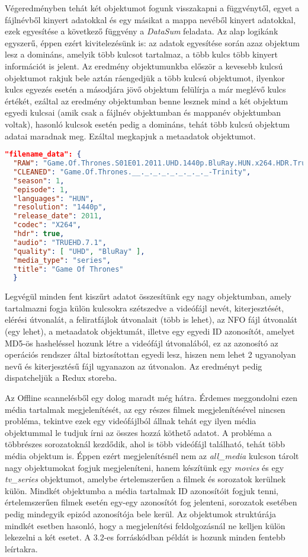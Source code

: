 Végeredményben tehát két objektumot fogunk visszakapni a függvénytől, egyet a fájlnévből kinyert adatokkal és egy másikat a mappa nevéből kinyert adatokkal, ezek egyesítése a következő függvény a {\it DataSum} feladata. Az alap logikánk egyszerű, éppen ezért kivitelezésünk is: az adatok egyesítése során azaz objektum lesz a domináns, amelyik több kulcsot tartalmaz, a több kulcs több kinyert információt is jelent. Az eredmény objektumunkba először a kevesebb kulcsú objektumot rakjuk bele aztán ráengedjük a több kulcsú objektumot, ilyenkor kulcs egyezés esetén a másodjára jövő objektum felülírja a már meglévő kulcs értékét, ezáltal az eredmény objektumban benne lesznek mind a két objektum egyedi kulcsai (amik csak a fájlnév objektumban és mappanév objektumban voltak), hasonló kulcsok esetén pedig a domináns, tehát több kulcsú objektum adatai maradnak meg. Ezáltal megkapjuk a metaadatok objektumot.

\begin{lstlisting}[language={json}]
"filename_data": {
  "RAW": "Game.Of.Thrones.S01E01.2011.UHD.1440p.BluRay.HUN.x264.HDR.TrueHD.7.1-Trinity",
  "CLEANED": "Game.Of.Thrones.__._._._._._._._._-Trinity",
  "season": 1,
  "episode": 1,
  "languages": "HUN",
  "resolution": "1440p",
  "release_date": 2011,
  "codec": "X264",
  "hdr": true,
  "audio": "TRUEHD.7.1",
  "quality": [ "UHD", "BluRay" ],
  "media_type": "series",
  "title": "Game Of Thrones"
  }
\end{lstlisting}

Legvégül minden fent kiszűrt adatot összesítünk egy nagy objektumban, amely tartalmazni fogja külön kulcsokra szétszedve a videófájl nevét, kiterjesztését, elérési útvonalát, a feliratfájlok útvonalait (több is lehet), az NFO fájl útvonalát (egy lehet), a metaadatok objektumát, illetve egy egyedi ID azonosítót, amelyet MD5-ös hasheléssel hozunk létre a videófájl útvonalából, ez az azonosító az operációs rendszer által biztosítottan egyedi lesz, hiszen nem lehet 2 ugyanolyan nevű és kiterjesztésű fájl ugyanazon az útvonalon. Az eredményt pedig dispatcheljük a Redux storeba.

Az Offline scannelésből egy dolog maradt még hátra. Érdemes meggondolni ezen média tartalmak megjelenítését, az egy részes filmek megjelenítésével nincsen probléma, tekintve ezek egy videófájlból állnak tehát egy ilyen média objektummal le tudjuk írni az összes hozzá köthető adatot. A probléma a többrészes sorozatoknál kezdődik, ahol is több videófájl található, tehát több média objektum is. Éppen ezért megjelenítésnél nem az {\it all\_media } kulcson tárolt nagy objektumokat fogjuk megjeleníteni, hanem készítünk egy {\it movies } és egy {\it tv\_series } objektumot, amelybe értelemszerűen a filmek és sorozatok kerülnek külön. Mindkét objektumba a média tartalmak ID azonosítóit fogjuk tenni, értelemszerűen filmek esetén egy-egy azonosítót fog jelenteni, sorozatok esetében pedig mindegyik epizód azonosítója bele kerül. Az objektumok struktúrája mindkét esetben hasonló, hogy a megjelenítési feldolgozásnál ne kelljen külön lekezelni a két esetet. A 3.2-es forráskódban példát is hozunk minden fentebb leírtakra.

